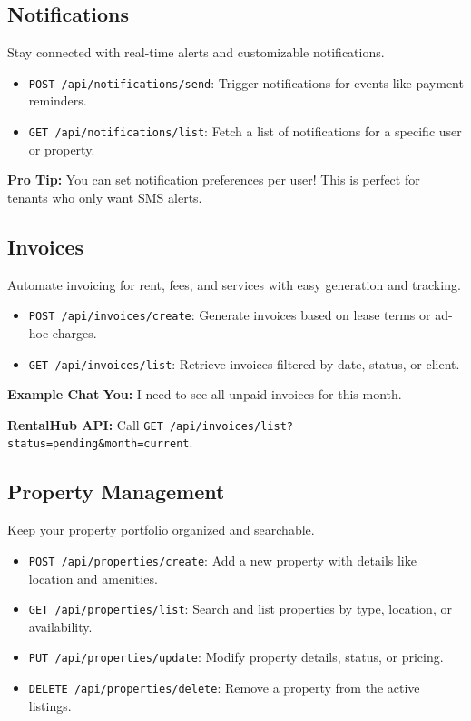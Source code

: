 \documentclass[11pt]{article}
\begin{document}
\subsection{Notifications}
Stay connected with real-time alerts and customizable notifications.

\begin{itemize}[leftmargin=*]
  \item \texttt{POST /api/notifications/send}: Trigger notifications for events like payment reminders.
  \item \texttt{GET /api/notifications/list}: Fetch a list of notifications for a specific user or property.
\end{itemize}

\begin{tipbox}
\noindent
\textbf{Pro Tip:} You can set notification preferences per user! This is perfect for tenants who only want SMS alerts.
\end{tipbox}

\subsection{Invoices}
Automate invoicing for rent, fees, and services with easy generation and tracking.

\begin{itemize}[leftmargin=*]
  \item \texttt{POST /api/invoices/create}: Generate invoices based on lease terms or ad-hoc charges.
  \item \texttt{GET /api/invoices/list}: Retrieve invoices filtered by date, status, or client.
\end{itemize}

\begin{chatbox}
\noindent
\textbf{Example Chat}  
\textbf{You:} I need to see all unpaid invoices for this month.  

\textbf{RentalHub API:} Call \texttt{GET /api/invoices/list?status=pending\&month=current}.
\end{chatbox}

\subsection{Property Management}
Keep your property portfolio organized and searchable.

\begin{itemize}[leftmargin=*]
  \item \texttt{POST /api/properties/create}: Add a new property with details like location and amenities.
  \item \texttt{GET /api/properties/list}: Search and list properties by type, location, or availability.
  \item \texttt{PUT /api/properties/update}: Modify property details, status, or pricing.
  \item \texttt{DELETE /api/properties/delete}: Remove a property from the active listings.
\end{itemize}
\end{document}
